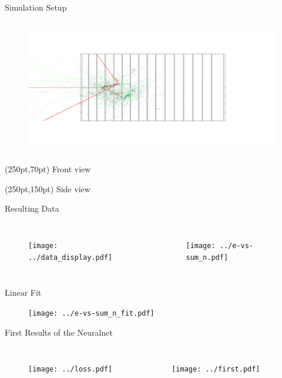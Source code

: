 \documentclass[10pt]{beamer}
\begin{document}
\begin{frame}{Simulation Setup}
\begin{columns}
\begin{figure}[htp]
      \includegraphics[width=1.1\textwidth]{side.png}
    \end{figure}
  \end{columns}
  \begin{textblock*}{100pt}(250pt,70pt)
    Front view
  \end{textblock*}
  \begin{textblock*}{100pt}(250pt,150pt)
    Side view
  \end{textblock*}
\end{frame}

\begin{frame}{Resulting Data}
  \begin{columns}
    \begin{figure}[htp]
      \texttt{[image: ../data\_display.pdf]}
    \end{figure}
    \begin{figure}[htp]
      \texttt{[image: ../e-vs-sum\_n.pdf]}
    \end{figure}
  \end{columns}
\end{frame}

\begin{frame}{Linear Fit}
    \begin{figure}[htp]
      \texttt{[image: ../e-vs-sum\_n\_fit.pdf]}
    \end{figure}  
\end{frame}

\begin{frame}{First Results of the Neuralnet}
  \begin{columns}
    \begin{figure}[htp]
      \texttt{[image: ../loss.pdf]}
    \end{figure}
    \begin{figure}[htp]
      \texttt{[image: ../first.pdf]}
    \end{figure}
  \end{columns}
\end{frame}
\end{document}
